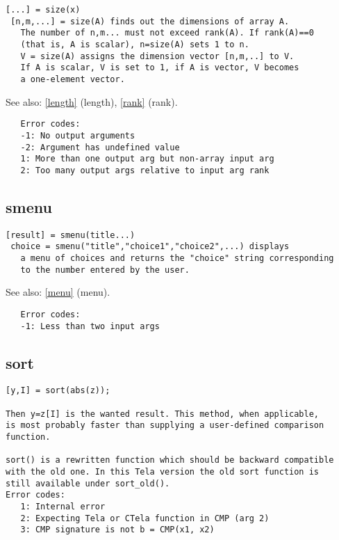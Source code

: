 \documentclass[a4paper]{article}
\begin{document}
\begin{tscreen}
\begin{verbatim}
[...] = size(x)
 [n,m,...] = size(A) finds out the dimensions of array A.
   The number of n,m... must not exceed rank(A). If rank(A)==0
   (that is, A is scalar), n=size(A) sets 1 to n.
   V = size(A) assigns the dimension vector [n,m,..] to V.
   If A is scalar, V is set to 1, if A is vector, V becomes
   a one-element vector.
\end{verbatim}

See also: \ref{length} {(length)}, \ref{rank} {(rank)}.
\begin{verbatim}
   Error codes:
   -1: No output arguments
   -2: Argument has undefined value
   1: More than one output arg but non-array input arg
   2: Too many output args relative to input arg rank 
\end{verbatim}
\end{tscreen}



\subsection{smenu\label{smenu}}

\begin{tscreen}
\begin{verbatim}
[result] = smenu(title...)
 choice = smenu("title","choice1","choice2",...) displays
   a menu of choices and returns the "choice" string corresponding
   to the number entered by the user.
\end{verbatim}

See also: \ref{menu} {(menu)}.
\begin{verbatim}
   Error codes:
   -1: Less than two input args 
\end{verbatim}
\end{tscreen}



\subsection{sort\label{sort}}

\begin{tscreen}
\begin{verbatim}
[y,I] = sort(abs(z));

Then y=z[I] is the wanted result. This method, when applicable,
is most probably faster than supplying a user-defined comparison
function.

sort() is a rewritten function which should be backward compatible
with the old one. In this Tela version the old sort function is
still available under sort_old().
Error codes:
   1: Internal error
   2: Expecting Tela or CTela function in CMP (arg 2)
   3: CMP signature is not b = CMP(x1, x2)
\end{verbatim}
\end{tscreen}
\end{document}
